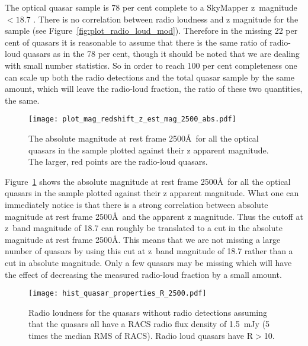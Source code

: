 \documentclass[a4paper,fleqn,usenatbib]{mnras}
\begin{document}

The optical quasar sample is 78 per cent complete to a SkyMapper z~magnitude $<18.7$ \citep{onken22}.  There is no correlation between radio loudness and z magnitude for the sample (see Figure~\ref{fig:plot_radio_loud_mod}).  Therefore in the missing 22 per cent of quasars it is reasonable to assume that there is the same ratio of radio-loud quasars as in the 78 per cent, {though it should be noted that we are dealing with small number statistics.}  So in order to reach 100 per cent completeness one can scale up both the radio detections and the total quasar sample by the same amount, which will leave the radio-loud fraction, the ratio of these two quantities, the same.


\begin{figure}
  \texttt{[image: plot\_mag\_redshift\_z\_est\_mag\_2500\_abs.pdf]}  
  \caption{The absolute magnitude at rest frame 2500\AA\ for all the optical quasars in the sample plotted against their z apparent magnitude.  The larger, red points are the radio-loud quasars.}
  \label{fig:plot_mag_redshift}
\end{figure}


Figure~\ref{fig:plot_mag_redshift} shows the absolute magnitude at rest frame 2500\AA\ for all the optical quasars in the sample plotted against their z apparent magnitude.  What one can immediately notice is that there is a strong correlation between absolute magnitude at rest frame 2500\AA\ and the apparent z magnitude.  Thus the cutoff at z~band magnitude of 18.7 can roughly be translated to a cut in the absolute magnitude at rest frame 2500\AA.  This means that we are not missing a large number of quasars by using this cut at z~band magnitude of 18.7 rather than a cut in absolute magnitude.  Only a few quasars may be missing which will have the effect of decreasing the measured radio-loud fraction by a small amount.  


\begin{figure}
  \texttt{[image: hist\_quasar\_properties\_R\_2500.pdf]}
  \caption{Radio loudness for the quasars {without radio detections} assuming that the quasars all have a RACS radio flux density of 1.5~mJy (5 times the median RMS of RACS).  Radio loud quasars have R$>$10.}
  \label{fig:hist_quasar_properties_R_2500}
\end{figure}
\end{document}
